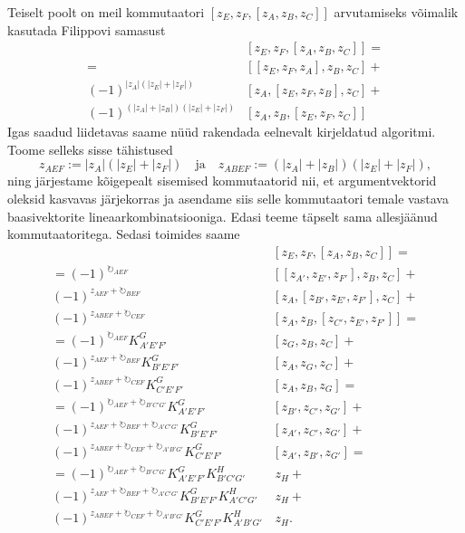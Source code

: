 Teiselt poolt on meil kommutaatori $\left[ z_E, z_F, [z_A, z_B, z_C] \right]$
arvutamiseks võimalik kasutada Filippovi samasust
\begin{align*}
    &\left[ z_E, z_F, [z_A, z_B, z_C] \right] = \\
    = &\left[[z_E, z_F, z_A], z_B, z_C\right] + \\
    (-1)^{|z_A|(|z_E|+|z_F|)}
        &\left[z_A, [z_E, z_F, z_B], z_C \right] + \\
    (-1)^{(|z_A|+|z_B|)(|z_E|+|z_F|)}
        &\left[z_A, z_B, [z_E, z_F, z_C] \right]
\end{align*}
Igas saadud liidetavas saame nüüd rakendada eelnevalt kirjeldatud algoritmi.
Toome selleks sisse tähistused
\[
    z_{AEF} := |z_A|(|z_E|+|z_F|)
    \quad \text{ja} \quad
    z_{ABEF} := (|z_A|+|z_B|)(|z_E|+|z_F|),
\]
ning järjestame kõigepealt sisemised kommutaatorid nii, et argumentvektorid
oleksid kasvavas järjekorras ja asendame siis selle kommutaatori temale vastava
baasivektorite lineaarkombinatsiooniga. Edasi teeme täpselt sama allesjäänud
kommutaatoritega. Sedasi toimides saame
\begin{align*}
    &\left[ z_E, z_F, [z_A, z_B, z_C] \right] = \\
    = (-1)^{\circlearrowright_{AEF}}
        &\left[ [z_{A'}, z_{E'}, z_{F'}], z_B, z_C \right] + \\
    (-1)^{z_{AEF} + \circlearrowright_{BEF}}
        &\left[ z_A, [z_{B'}, z_{E'}, z_{F'}], z_C \right] + \\
    (-1)^{z_{ABEF} + \circlearrowright_{CEF}}
        &\left[ z_A, z_B, [z_{C'}, z_{E'}, z_{F'}] \right] = \\
    = (-1)^{\circlearrowright_{AEF}} K_{A' E' F'}^G
        &\left[ z_G, z_B, z_C \right] + \\
    (-1)^{z_{AEF} + \circlearrowright_{BEF}} K_{B' E' F'}^G
        &\left[ z_A, z_G, z_C \right] + \\
    (-1)^{z_{ABEF} + \circlearrowright_{CEF}} K_{C' E' F'}^G
        &\left[ z_A, z_B, z_G \right] = \\
    = (-1)^{\circlearrowright_{AEF} + \circlearrowright_{B'C'G'}}
        K_{A' E' F'}^G
        &\left[ z_{B'}, z_{C'}, z_{G'} \right] + \\
    (-1)^{z_{AEF} + \circlearrowright_{BEF} + \circlearrowright_{A'C'G'}}
        K_{B' E' F'}^G
        &\left[ z_{A'}, z_{C'}, z_{G'} \right] + \\
    (-1)^{z_{ABEF} + \circlearrowright_{CEF} + \circlearrowright_{A'B'G'}}
        K_{C' E' F'}^G
        &\left[ z_{A'}, z_{B'}, z_{G'} \right] = \\
    = (-1)^{\circlearrowright_{AEF} + \circlearrowright_{B'C'G'}}
        K_{A' E' F'}^G K_{B' C' G'}^H
        &\,z_H + \\
    (-1)^{z_{AEF} + \circlearrowright_{BEF} + \circlearrowright_{A'C'G'}}
        K_{B' E' F'}^G K_{A' C' G'}^H
        &\,z_H + \\
    (-1)^{z_{ABEF} + \circlearrowright_{CEF} + \circlearrowright_{A'B'G'}}
        K_{C' E' F'}^G K_{A' B' G'}^H
        &\,z_H.
\end{align*}

